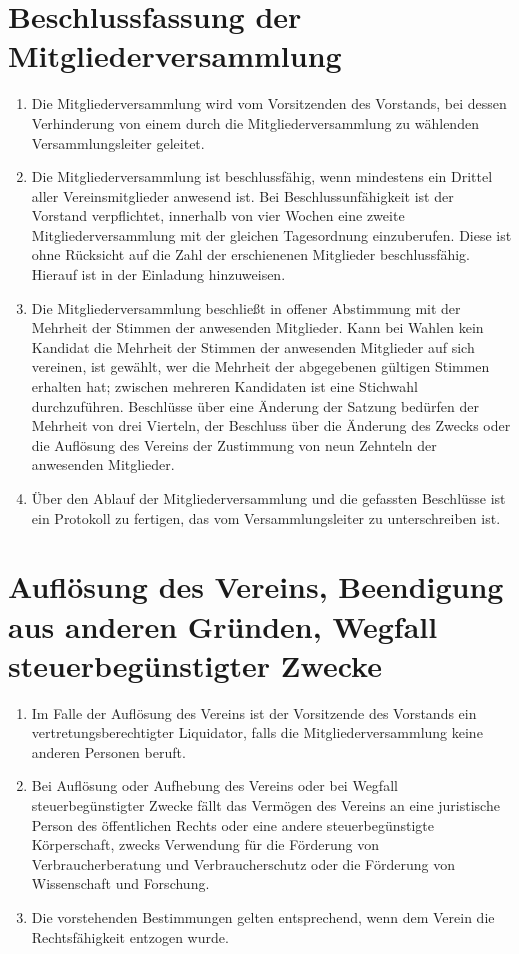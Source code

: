 \section{Beschlussfassung der Mitgliederversammlung}
\begin{enumerate}[label=(\arabic*)]
    \item Die Mitgliederversammlung wird vom Vorsitzenden des Vorstands, bei
        dessen Verhinderung von einem durch die Mitgliederversammlung zu wählenden
        Versammlungsleiter geleitet.
    \item Die Mitgliederversammlung ist beschlussfähig, wenn mindestens ein
        Drittel aller Vereinsmitglieder anwesend ist. Bei Beschlussunfähigkeit
        ist der Vorstand verpflichtet, innerhalb von vier Wochen eine zweite
        Mitgliederversammlung mit der gleichen Tagesordnung einzuberufen.
        Diese ist ohne Rücksicht auf die Zahl der erschienenen Mitglieder
        beschlussfähig. Hierauf ist in der Einladung hinzuweisen.
    \item Die Mitgliederversammlung beschließt in offener Abstimmung mit der
        Mehrheit der Stimmen der anwesenden Mitglieder. Kann bei Wahlen kein
        Kandidat die Mehrheit der Stimmen der anwesenden Mitglieder auf sich
        vereinen, ist gewählt, wer die Mehrheit der abgegebenen gültigen
        Stimmen erhalten hat; zwischen mehreren Kandidaten ist eine Stichwahl
        durchzuführen. Beschlüsse über eine Änderung der Satzung bedürfen
        der Mehrheit von drei Vierteln, der Beschluss über die Änderung des
        Zwecks oder die Auflösung des Vereins der Zustimmung von neun Zehnteln
        der anwesenden Mitglieder.
    \item Über den Ablauf der Mitgliederversammlung und die gefassten
        Beschlüsse ist ein Protokoll zu fertigen, das vom Versammlungsleiter zu
        unterschreiben ist.
\end{enumerate}

\section{Auflösung des Vereins, Beendigung aus anderen Gründen, Wegfall steuerbegünstigter Zwecke}
\begin{enumerate}[label=(\arabic*)]
    \item Im Falle der Auflösung des Vereins ist der Vorsitzende des Vorstands
        ein vertretungsberechtigter Liquidator, falls die
        Mitgliederversammlung keine anderen Personen beruft.
    \item Bei Auflösung oder Aufhebung des Vereins oder bei Wegfall
        steuerbegünstigter Zwecke fällt das Vermögen des Vereins an eine
        juristische Person des öffentlichen Rechts oder eine andere
        steuerbegünstigte Körperschaft, zwecks Verwendung für die Förderung von
        Verbraucherberatung und Verbraucherschutz oder die Förderung von
        Wissenschaft und Forschung.
    \item Die vorstehenden Bestimmungen gelten entsprechend, wenn dem Verein
        die Rechtsfähigkeit entzogen wurde.
\end{enumerate}


